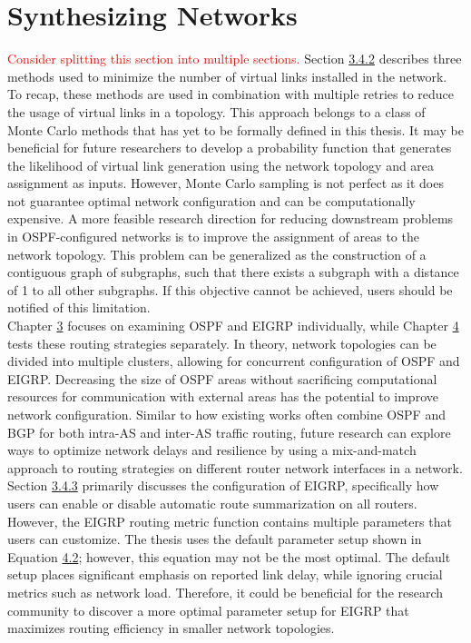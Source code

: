 \documentclass{uiucthesis2021}
\begin{document}
\section{Synthesizing Networks}
\textcolor{red}{Consider splitting this section into multiple sections.}
\noindent Section \hyperref[s342]{3.4.2} describes three methods used to minimize the number of virtual links installed in the network. To recap, these methods are used in combination with multiple retries to reduce the usage of virtual links in a topology. This approach belongs to a class of Monte Carlo methods that has yet to be formally defined in this thesis. It may be beneficial for future researchers to develop a probability function that generates the likelihood of virtual link generation using the network topology and area assignment as inputs. However, Monte Carlo sampling is not perfect as it does not guarantee optimal network configuration and can be computationally expensive. A more feasible research direction for reducing downstream problems in OSPF-configured networks is to improve the assignment of areas to the network topology. This problem can be generalized as the construction of a contiguous graph of subgraphs, such that there exists a subgraph with a distance of 1 to all other subgraphs. If this objective cannot be achieved, users should be notified of this limitation.\\

\noindent Chapter \hyperref[c3]{3} focuses on examining OSPF and EIGRP individually, while Chapter \hyperref[c4]{4} tests these routing strategies separately. In theory, network topologies can be divided into multiple clusters, allowing for concurrent configuration of OSPF and EIGRP. Decreasing the size of OSPF areas without sacrificing computational resources for communication with external areas has the potential to improve network configuration. Similar to how existing works often combine OSPF and BGP for both intra-AS and inter-AS traffic routing, future research can explore ways to optimize network delays and resilience by using a mix-and-match approach to routing strategies on different router network interfaces in a network. \\

\noindent Section \hyperref[s343]{3.4.3} primarily discusses the configuration of EIGRP, specifically how users can enable or disable automatic route summarization on all routers. However, the EIGRP routing metric function contains multiple parameters that users can customize. The thesis uses the default parameter setup shown in Equation \hyperref[e42]{4.2}; however, this equation may not be the most optimal. The default setup places significant emphasis on reported link delay, while ignoring crucial metrics such as network load. Therefore, it could be beneficial for the research community to discover a more optimal parameter setup for EIGRP that maximizes routing efficiency in smaller network topologies. \\
\end{document}
